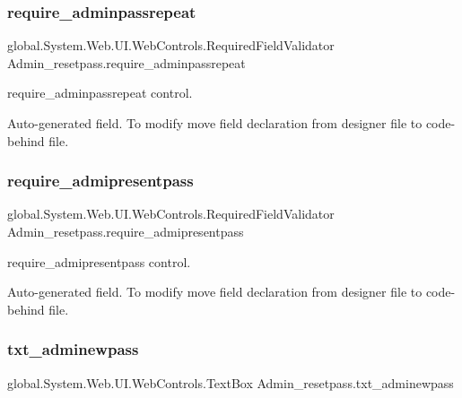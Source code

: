 \subsubsection{\texorpdfstring{require\_adminpassrepeat}{require\_adminpassrepeat}}
{\footnotesize\ttfamily global.\+System.\+Web.\+U\+I.\+Web\+Controls.\+Required\+Field\+Validator Admin\+\_\+resetpass.\+require\+\_\+adminpassrepeat\hspace{0.3cm}{\ttfamily [protected]}}



require\+\_\+adminpassrepeat control. 

Auto-\/generated field. To modify move field declaration from designer file to code-\/behind file. \mbox{\label{class_admin__resetpass_a54fde1892a9b940b8721aea7be15c9a0}} 
\subsubsection{\texorpdfstring{require\_admipresentpass}{require\_admipresentpass}}
{\footnotesize\ttfamily global.\+System.\+Web.\+U\+I.\+Web\+Controls.\+Required\+Field\+Validator Admin\+\_\+resetpass.\+require\+\_\+admipresentpass\hspace{0.3cm}{\ttfamily [protected]}}



require\+\_\+admipresentpass control. 

Auto-\/generated field. To modify move field declaration from designer file to code-\/behind file. \mbox{\label{class_admin__resetpass_a9e52ae1d9342024a879798fe169f7f4d}} 
\subsubsection{\texorpdfstring{txt\_adminewpass}{txt\_adminewpass}}
{\footnotesize\ttfamily global.\+System.\+Web.\+U\+I.\+Web\+Controls.\+Text\+Box Admin\+\_\+resetpass.\+txt\+\_\+adminewpass\hspace{0.3cm}{\ttfamily [protected]}}



